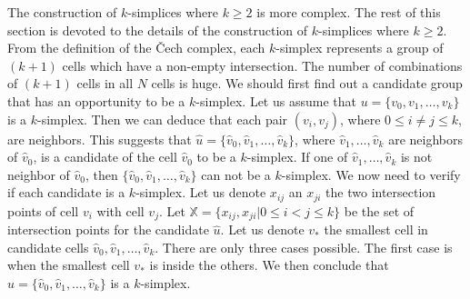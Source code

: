 \documentclass[conference]{IEEEtran}
\begin{document}
The construction of $k$-simplices where $k \geq 2$ is more complex. The rest of this section is devoted to the details of the construction of $k$-simplices where $k \geq 2$. From the definition of the \v{C}ech complex, each $k$-simplex represents a group of $(k+1)$ cells which have a non-empty intersection. The number of combinations of $(k+1)$ cells in all $N$ cells is huge. We should first find out a candidate group that has an opportunity to be a $k$-simplex. Let us assume that $u = \{v_0, v_1, \ldots, v_k\}$ is a $k$-simplex. Then we can deduce that each pair $(v_i, v_j)$, where $0 \leq i \neq j \leq k$, are neighbors. This suggests that $\hat{u} = \{\hat{v}_0, \hat{v}_1, \ldots, \hat{v}_k\}$, where $\hat{v}_1, \ldots, \hat{v}_k$ are neighbors of $\hat{v}_0$, is a candidate of the cell $\hat{v}_0$ to be a $k$-simplex. If one of $\hat{v}_1, \ldots, \hat{v}_k$ is not neighbor of $\hat{v}_0$, then $\{\hat{v}_0, \hat{v}_1, \ldots, \hat{v}_k\}$ can not be a $k$-simplex. We now need to verify if each candidate is a $k$-simplex. Let us denote $x_{ij}$ an $x_{ji}$ the two intersection points of cell $v_i$ with cell $v_j$. Let $\mathbb{X} = \{x_{ij}, x_{ji} | 0 \leq i < j \leq k\}$ be the set of intersection points for the candidate $\hat{u}$. Let us denote $v_{\ast}$ the smallest cell in candidate cells $\hat{v}_0, \hat{v}_1, \ldots, \hat{v}_k$.
There are only three cases possible. The first case is when the smallest cell $v_{\ast}$ is inside the others. We then conclude that $\hat{u} = \{\hat{v}_0, \hat{v}_1, \ldots, \hat{v}_k\}$ is a $k$-simplex.
\end{document}
